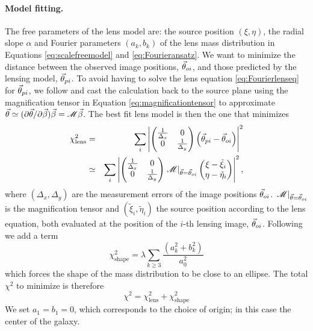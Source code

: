 \paragraph{Model fitting.} The free parameters of the lens model are: the source position $(\xi,\eta)$, the radial slope $\alpha$ and Fourier parameters $(a_k,b_k)$ of the lens mass distribution in Equations \eqref{eq:scalefreemodel} and \eqref{eq:Fourieransatz}. We want to minimize the distance between the observed image positions, $\vec{\theta}_{oi}$, and those predicted by the lensing model, $\vec{\theta}_{pi}$. To avoid having to solve the lens equation \eqref{eq:Fourierlenseq} for $\vec{\theta}_{pi}$, we follow \citet{1991ApJ...373..354K} and cast the calculation back to the source plane using the magnification tensor in Equation \eqref{eq:magnificationtensor} to approximate $\vec{\theta} \simeq (\partial \vec{\theta} / \partial \vec{\beta}) \vec{\beta} = \mathscr{M} \vec{\beta} $. The best fit lens model is then the one that minimizes
\begin{eqnarray}
\chi^2_\text{lens} &=& \sum_{i} \left|\left( \begin{matrix} \frac{1}{\Delta_x} & 0\\0 & \frac{1}{\Delta_y}\end{matrix}\right) \left( \vec{\theta}_{pi} - \vec{\theta}_{oi} \right)\right|^2\nonumber\\
&\simeq& \sum_{i} \left|\left( \begin{matrix} \frac{1}{\Delta_x} & 0\\0 & \frac{1}{\Delta_y}\end{matrix}\right)  \left.\mathscr{M}\right|_{\vec{\theta}=\vec{\theta}_{oi}} \left( \begin{matrix} \xi - \tilde{\xi}_i \\ \eta - \tilde{\eta}_i \end{matrix} \right) \right|^2,\label{eq:chi2lens}
\end{eqnarray}
where $(\Delta_x,\Delta_y)$ are the measurement errors of the image positions $\vec{\theta}_{oi}$. $\left.\mathscr{M}\right|_{\vec{\theta}=\vec{\theta}_{oi}}$ is the magnification tensor and $(\tilde{\xi}_i,\tilde{\eta}_i)$ the source position according to the lens equation, both evaluated at the position of the $i$-th lensing image, $\vec{\theta}_{oi}$. Following \citet{GlennEC} we add a term
\begin{equation}
\chi^2_\text{shape} = \lambda \sum_{k \geq 3} \frac{\left(a_k^2 +b_k^2 \right)}{a_0^2} \label{eq:chi2shape}
\end{equation}
which forces the shape of the mass distribution to be close to an ellipse. The total $\chi^2$ to minimize is therefore
\begin{equation}
\chi^2 = \chi^2_\text{lens} + \chi^2_\text{shape} \label{eq:chi2total}
\end{equation}
We set $a_1 = b_1 = 0$, which corresponds to the choice of origin; in this case the center of the galaxy.

